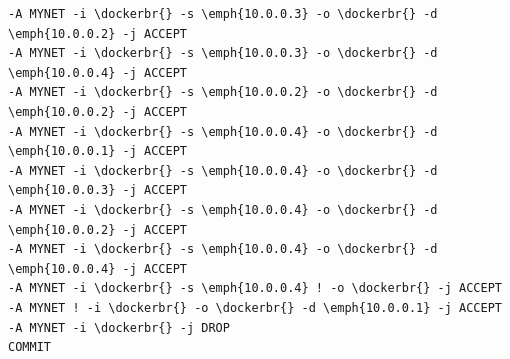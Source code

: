 \begin{frame}[fragile]
\begin{footnotesize}
\begin{columns}[t]
\begin{column}{0.48\textwidth}
\begin{Verbatim}[commandchars=\\\{\},codes={\catcode`$=3\catcode`^=7}]
-A MYNET -i \dockerbr{} -s \emph{10.0.0.3} -o \dockerbr{} -d \emph{10.0.0.2} -j ACCEPT
-A MYNET -i \dockerbr{} -s \emph{10.0.0.3} -o \dockerbr{} -d \emph{10.0.0.4} -j ACCEPT
-A MYNET -i \dockerbr{} -s \emph{10.0.0.2} -o \dockerbr{} -d \emph{10.0.0.2} -j ACCEPT
-A MYNET -i \dockerbr{} -s \emph{10.0.0.4} -o \dockerbr{} -d \emph{10.0.0.1} -j ACCEPT
-A MYNET -i \dockerbr{} -s \emph{10.0.0.4} -o \dockerbr{} -d \emph{10.0.0.3} -j ACCEPT
-A MYNET -i \dockerbr{} -s \emph{10.0.0.4} -o \dockerbr{} -d \emph{10.0.0.2} -j ACCEPT
-A MYNET -i \dockerbr{} -s \emph{10.0.0.4} -o \dockerbr{} -d \emph{10.0.0.4} -j ACCEPT
-A MYNET -i \dockerbr{} -s \emph{10.0.0.4} ! -o \dockerbr{} -j ACCEPT
-A MYNET ! -i \dockerbr{} -o \dockerbr{} -d \emph{10.0.0.1} -j ACCEPT
-A MYNET -i \dockerbr{} -j DROP
COMMIT
\end{Verbatim}
	\end{column}
	\end{columns}
	\end{footnotesize}
\end{frame}



